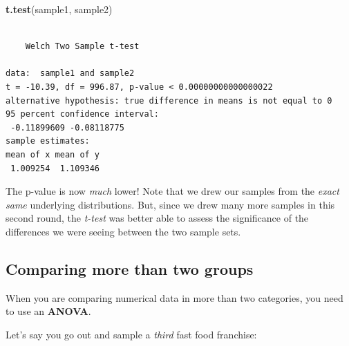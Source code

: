 \documentclass[
]{book}
\newenvironment{Shaded}{\begin{snugshade}}{\end{snugshade}}
\newcommand{\KeywordTok}[1]{\textcolor[rgb]{0.13,0.29,0.53}{\textbf{#1}}}
\newcommand{\NormalTok}[1]{#1}
\begin{document}
\begin{Shaded}
\begin{Highlighting}[]
\KeywordTok{t.test}\NormalTok{(sample1, }
\NormalTok{       sample2)}
\end{Highlighting}
\end{Shaded}

\begin{verbatim}

    Welch Two Sample t-test

data:  sample1 and sample2
t = -10.39, df = 996.87, p-value < 0.00000000000000022
alternative hypothesis: true difference in means is not equal to 0
95 percent confidence interval:
 -0.11899609 -0.08118775
sample estimates:
mean of x mean of y 
 1.009254  1.109346 
\end{verbatim}

The p-value is now \emph{much} lower! Note that we drew our samples from the \emph{exact same} underlying distributions. But, since we drew many more samples in this second round, the \emph{t-test} was better able to assess the significance of the differences we were seeing between the two sample sets.

\hypertarget{comparing-more-than-two-groups}{%
\subsection*{Comparing more than two groups}\label{comparing-more-than-two-groups}}

When you are comparing numerical data in more than two categories, you need to use an \textbf{ANOVA}.

Let's say you go out and sample a \emph{third} fast food franchise:
\end{document}
